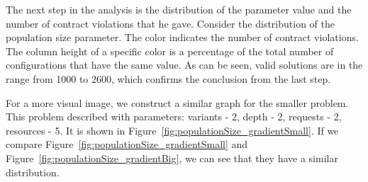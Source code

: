\begin{figure}
	{\caption[]{}\label{fig:populationSize_gradient}}%
\end{figure}

The next step in the analysis is the distribution of the parameter value and the number of contract violations that he gave. Consider the distribution of the population size parameter.
The color indicates the number of contract violations. The column height of a specific color is a percentage of the total number of configurations that have the same value. As can be seen, valid solutions are in the range from 1000 to 2600, which confirms the conclusion from the last step.

For a more visual image, we construct a similar graph for the smaller problem. This problem described with parameters: variants - 2, depth - 2, requests - 2, resources - 5.
It is shown in Figure~\ref{fig:populationSize_gradientSmall}. If we compare Figure~\ref{fig:populationSize_gradientSmall} and Figure~\ref{fig:populationSize_gradientBig}, we can see that they have a similar distribution.


